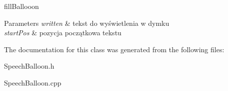 fill\+Ballooon 


\begin{DoxyParams}{Parameters}
{\em written} & tekst do wyświetlenia w dymku \\
\hline
{\em start\+Pos} & pozycja początkowa tekstu \\
\hline
\end{DoxyParams}


The documentation for this class was generated from the following files\+:\begin{DoxyCompactItemize}
\item 
Speech\+Balloon.\+h\item 
Speech\+Balloon.\+cpp\end{DoxyCompactItemize}
